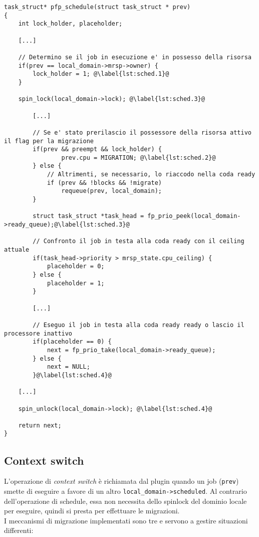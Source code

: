 \begin{lstlisting}
task_struct* pfp_schedule(struct task_struct * prev)
{
	int lock_holder, placeholder;

	[...]

	// Determino se il job in esecuzione e' in possesso della risorsa
	if(prev == local_domain->mrsp->owner) {
		lock_holder = 1; @\label{lst:sched.1}@
	}

	spin_lock(local_domain->lock); @\label{lst:sched.3}@

		[...]

		// Se e' stato prerilascio il possessore della risorsa attivo il flag per la migrazione
		if(prev && preempt && lock_holder) {
				prev.cpu = MIGRATION; @\label{lst:sched.2}@
		} else {
			// Altrimenti, se necessario, lo riaccodo nella coda ready
			if (prev && !blocks && !migrate)
				requeue(prev, local_domain);
		}

		struct task_struct *task_head = fp_prio_peek(local_domain->ready_queue);@\label{lst:sched.3}@

		// Confronto il job in testa alla coda ready con il ceiling attuale
		if(task_head->priority > mrsp_state.cpu_ceiling) {
			placeholder = 0;
		} else {
			placeholder = 1;
		}
		
		[...]

		// Eseguo il job in testa alla coda ready ready o lascio il processore inattivo
		if(placeholder == 0) {
			next = fp_prio_take(local_domain->ready_queue);
		} else {
			next = NULL;
		}@\label{lst:sched.4}@

	[...]

	spin_unlock(local_domain->lock); @\label{lst:sched.4}@

	return next;
}
\end{lstlisting}


\subsection{Context switch}
\label{sec:impl.c_s}

L'operazione di \textit{context switch} è richiamata dal plugin quando un job (\texttt{prev}) smette di eseguire a favore di un altro \texttt{local\_domain->scheduled}. Al contrario dell'operazione di schedule, essa non necessita dello spinlock del dominio locale per eseguire, quindi si presta per effettuare le migrazioni.\\

I meccanismi di migrazione implementati sono tre e servono a gestire situazioni differenti:

